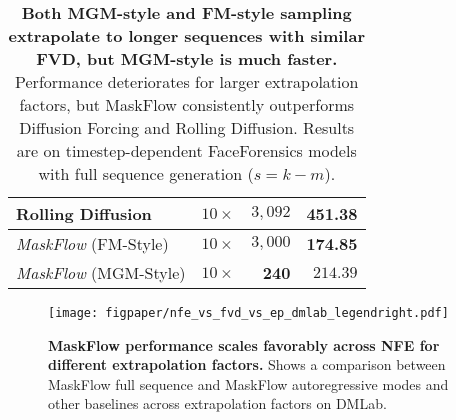 \begin{table}[ht!]
{\begin{tabular}{l|crr}
        Rolling Diffusion~\cite{ruhe2024rollingdiffusionmodels} & $10\times$ & $3{,}092$ & 451.38 \\ 
        \hline
        \textit{MaskFlow} (FM-Style) & $10\times$ & $3{,}000$ & \textbf{174.85} \\
        \rowcolor{gray!8}\textit{MaskFlow} (MGM-Style) & $10\times$ & \textbf{240}  & $214.39$ \\
        \bottomrule
    \end{tabular}}
    \vspace{-7pt}
    \caption{\textbf{Both MGM-style and FM-style sampling extrapolate to longer sequences with similar FVD, but MGM-style is much faster.} Performance deteriorates for larger extrapolation factors, but MaskFlow consistently outperforms Diffusion Forcing and Rolling Diffusion. Results are on timestep-dependent FaceForensics models with full sequence generation ($s = k - m$).}
    \label{tab:extrapolation}
\end{table}


\begin{comment}
\begin{figure}
    \centering
    \begin{subfigure}[t]{0.495\columnwidth}
        \centering
        \texttt{[image: figpaper/nfe\_vs\_fvd\_vs\_ep\_ffs.pdf]}
        \caption{\textbf{FaceForensics}}
        \label{fig:ffs}
    \end{subfigure}\hfill
    \begin{subfigure}[t]{0.495\columnwidth}
        \centering
        \texttt{[image: figpaper/nfe\_vs\_fvd\_vs\_ep\_dmlab.pdf]}
        \caption{\textbf{DMLab}}
        \label{fig:dmlab}
    \end{subfigure}
    \caption{\textbf{MaskFlow performance scales favorably across NFE for different extrapolation factors across both datasets.} Shows a comparison between MaskFlow full sequence and MaskFlow autoregressive modes and other baselines across extrapolation factors.}
    \vspace{-10pt}
    \label{fig:maskflow_scaling}
\end{figure}
\end{comment}


\begin{figure}
    \centering
    \texttt{[image: figpaper/nfe\_vs\_fvd\_vs\_ep\_dmlab\_legendright.pdf]}
    \vspace{-18pt}
    \caption{\textbf{MaskFlow performance scales favorably across NFE for different extrapolation factors.} Shows a comparison between MaskFlow full sequence and MaskFlow autoregressive modes and other baselines across extrapolation factors on DMLab.}
    \vspace{-10pt}
    \label{fig:maskflow_scaling}
\end{figure}


